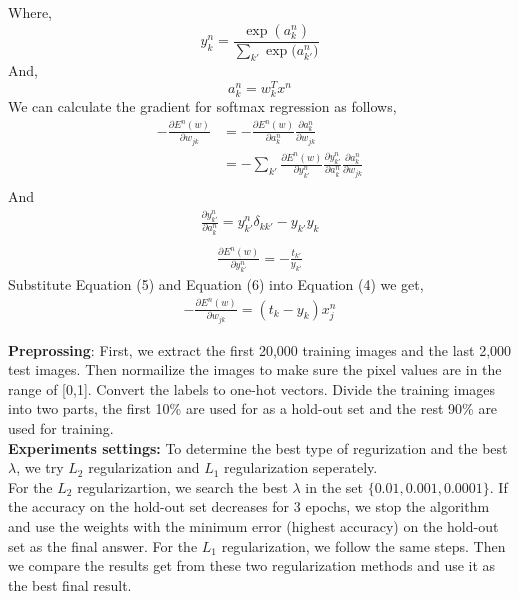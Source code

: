 \documentclass{article} %
\begin{document}
Where, 
\begin{equation}
	y_k^n = \frac{\exp{(a_k^n)}}{ \sum_{k'}\exp{(a_{k'}^n})}
\end{equation}
And,
\begin{equation}
	a_k^n = w_k^Tx^n
\end{equation}
We can calculate the gradient for softmax regression as follows,
\begin{equation}
\begin{split}
-\frac{\partial E^n(w)}{\partial w_{jk}}& = - \frac{\partial E^n(w)}{\partial a_k^n}\frac{\partial a_k^n}{\partial w_{jk}} \\
& = -\sum_{k'} \frac{\partial E^n(w)}{\partial y^n_{k'}} \frac{\partial y^n_{k'}}{\partial a^n_k}\frac{\partial a_k^n}{\partial w_{jk}} \\
\end{split}
\end{equation}
And 
\begin{equation}
\begin{split}
\frac{\partial y^n_{k'}}{\partial a^n_k} =  y^n_{k'}\delta_{kk'} - y_{k
'}y_{k}\\
\end{split}
\end{equation}
\begin{equation}
\begin{split}
	\frac{\partial E^n(w)}{\partial y^n_{k'}} = -\frac{t_{k'}}{y_{k'}}
\end{split}
\end{equation}
Substitute Equation (5) and Equation (6) into Equation (4) we get,
\begin{equation}
\begin{split}
	-\frac{\partial E^n(w)}{\partial w_{jk}} = (t_k - y_k)x_j^n 
\end{split}
\end{equation}


\textbf{Preprossing}: First, we extract the first 20,000 training images and the last 2,000 test images. Then normailize the images to make sure the pixel values are in the range of [0,1]. Convert the labels to one-hot vectors. Divide the training images into two parts, the first 10\% are used for as a hold-out set and the rest 90\% are used for training.
\\
\textbf{Experiments settings:} To determine the best type of regurization and the best $\lambda$, we try $L_2$ regularization and $L_1$ regularization seperately.\\
 For the $L_2$ regularizartion, we search the best $\lambda$ in the set $\{0.01, 0.001, 0.0001\}$. If the accuracy on the hold-out set decreases for 3 epochs, we stop the algorithm and use the weights with the minimum error (highest accuracy) on the hold-out set as the final answer. For the $L_1$ regularization, we follow the same steps. Then we compare the results get from these two regularization methods and use it as the best final result.
 
\end{document}
